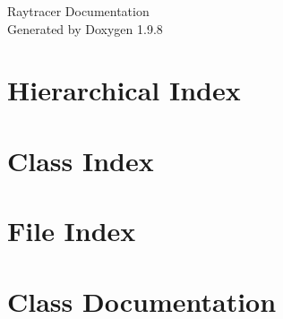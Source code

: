 \documentclass[twoside]{book}
\newcommand{\+}{\discretionary{\mbox{\scriptsize$\hookleftarrow$}}{}{}}
\newcommand{\clearemptydoublepage}{%
    \newpage{\pagestyle{empty}\cleardoublepage}%
  }
\begin{document}
  \raggedbottom
    \hypersetup{pageanchor=false,
                bookmarksnumbered=true,
                pdfencoding=unicode
               }
  \begin{titlepage}
  \vspace*{7cm}
  \begin{center}%
  {\Large Raytracer Documentation}\\
  \vspace*{1cm}
  {\large Generated by Doxygen 1.9.8}\\
  \end{center}
  \end{titlepage}
  \clearemptydoublepage
  \tableofcontents
  \clearemptydoublepage
  \hypersetup{pageanchor=true}







\chapter{Hierarchical Index}

\chapter{Class Index}

\chapter{File Index}

\chapter{Class Documentation}




























\end{document}
